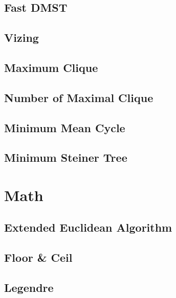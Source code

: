 \documentclass{article}
\begin{document}
\subsection{Fast DMST}


\subsection{Vizing}


\subsection{Maximum Clique}


\subsection{Number of Maximal Clique}


\subsection{Minimum Mean Cycle}


\subsection{Minimum Steiner Tree}


\section{Math}

\subsection{Extended Euclidean Algorithm}


\subsection{Floor \& Ceil}


\subsection{Legendre}

\end{document}
